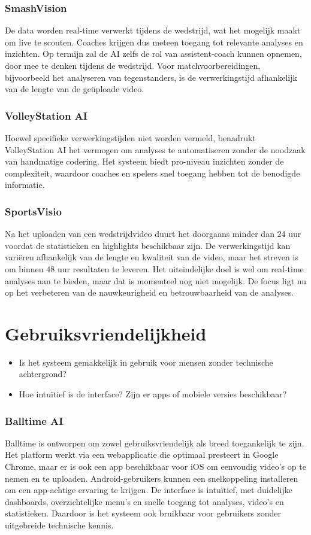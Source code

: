 \subsubsection{SmashVision}
De data worden real-time verwerkt tijdens de wedstrijd, wat het mogelijk maakt om live te scouten. Coaches krijgen dus meteen toegang tot relevante analyses en inzichten. Op termijn zal de AI zelfs de rol van assistent-coach kunnen opnemen, door mee te denken tijdens de wedstrijd. Voor matchvoorbereidingen, bijvoorbeeld het analyseren van tegenstanders, is de verwerkingstijd afhankelijk van de lengte van de geüploade video. \autocite{Doren2025}
\subsubsection{VolleyStation AI}
Hoewel specifieke verwerkingstijden niet worden vermeld, benadrukt VolleyStation AI het vermogen om analyses te automatiseren zonder de noodzaak van handmatige codering. Het systeem biedt pro-niveau inzichten zonder de complexiteit, waardoor coaches en spelers snel toegang hebben tot de benodigde informatie. \autocite{VolleyStationAI2025}
\subsubsection{SportsVisio}
Na het uploaden van een wedstrijdvideo duurt het doorgaans minder dan 24 uur voordat de statistieken en highlights beschikbaar zijn. De verwerkingstijd kan variëren afhankelijk van de lengte en kwaliteit van de video, maar het streven is om binnen 48 uur resultaten te leveren. \autocite{SportsVisio2025}Het uiteindelijke doel is wel om real-time analyses aan te bieden, maar dat is momenteel nog niet mogelijk. De focus ligt nu op het verbeteren van de nauwkeurigheid en betrouwbaarheid van de analyses. \autocite{Basaranlar2025}

\section{Gebruiksvriendelijkheid}
\begin{itemize}
  \item Is het systeem gemakkelijk in gebruik voor mensen zonder technische achtergrond?
  \item Hoe intuïtief is de interface? Zijn er apps of mobiele versies beschikbaar?
\end{itemize}
\subsubsection{Balltime AI}
Balltime is ontworpen om zowel gebruiksvriendelijk als breed toegankelijk te zijn. Het platform werkt via een webapplicatie die optimaal presteert in Google Chrome, maar er is ook een app beschikbaar voor iOS om eenvoudig video's op te nemen en te uploaden. Android-gebruikers kunnen een snelkoppeling installeren om een app-achtige ervaring te krijgen. De interface is intuïtief, met duidelijke dashboards, overzichtelijke menu’s en snelle toegang tot analyses, video’s en statistieken. Daardoor is het systeem ook bruikbaar voor gebruikers zonder uitgebreide technische kennis. \autocite{BalltimeAI2025}
